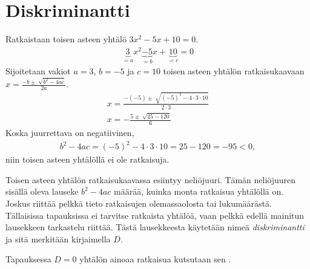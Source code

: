 \section{Diskriminantti}


\begin{esimerkki}
    Ratkaistaan toisen asteen yhtälö $3x^2-5x+10=0$.
    \begin{align*}
        \underbrace{3}_{=a}x^2\underbrace{-5}_{=b}x+\underbrace{10}_{=c}=0
    \end{align*}
    Sijoitetaan vakiot $a=3$, $b=-5$ ja $c=10$ toisen asteen yhtälön ratkaisukaavaan $x=\frac{-b \pm \sqrt[]{b^2-4ac}}{2a}$.
    \begin{align*}
        x=\frac{-(-5) \pm \sqrt[]{(-5)^2-4\cdot 3 \cdot 10}}{2 \cdot 3} \\
        x=-\frac{5 \pm \sqrt[]{25-120}}{6}
    \end{align*}
    Koska juurrettava on negatiivinen,
    \begin{align*}
        b^2-4ac=(-5)^2-4 \cdot 3 \cdot 10=25-120=-95<0,
    \end{align*}
    niin toisen asteen yhtälöllä ei ole ratkaisuja.
\end{esimerkki}


Toisen asteen yhtälön ratkaisukaavassa esiintyy neliöjuuri. Tämän neliöjuuren sisällä oleva lauseke $b^2-4ac$ määrää, kuinka monta ratkaisua yhtälöllä on. Joskus riittää pelkkä tieto ratkaisujen olemassaolosta tai lukumäärästä. Tällaisissa tapauksissa ei tarvitse ratkaista yhtälöä, vaan pelkkä edellä mainitun lausekkeen tarkastelu riittää. Tästä lausekkeesta käytetään nimeä \emph{diskriminantti} ja sitä merkitään kirjaimella $D$.

\newpage

Tapauksessa $D=0$ yhtälön ainoaa ratkaisua kutsutaan
sen .

